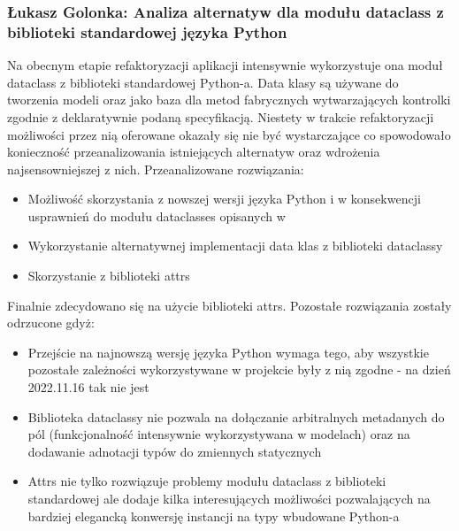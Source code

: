 \documentclass[12pt,a4paper,oneside]{article}
\theoremstyle{definition}
\numberwithin{equation}{section}
\begin{document}
\subsubsection{Łukasz Golonka: Analiza alternatyw dla modułu dataclass z biblioteki standardowej języka Python}
Na obecnym etapie refaktoryzacji aplikacji intensywnie wykorzystuje ona moduł dataclass z biblioteki standardowej Python-a.
Data klasy są używane do tworzenia modeli oraz jako baza dla metod fabrycznych wytwarzających kontrolki zgodnie z deklaratywnie podaną specyfikacją.
Niestety w trakcie refaktoryzacji możliwości przez nią oferowane okazały się nie być wystarczające co spowodowało konieczność przeanalizowania istniejących alternatyw oraz wdrożenia najsensowniejszej z nich.
Przeanalizowane rozwiązania:
\begin{itemize}
	\item Możliwość skorzystania z nowszej wersji języka Python i w konsekwencji usprawnień do modułu dataclasses opisanych w \cite{py310dcls}
	\item Wykorzystanie alternatywnej implementacji data klas z biblioteki dataclassy \cite{dataclassy}
	\item Skorzystanie z biblioteki attrs \cite{attrs}
\end{itemize}
Finalnie zdecydowano się na użycie biblioteki attrs. 
Pozostałe rozwiązania zostały odrzucone gdyż:
\begin{itemize}
	\item Przejście na najnowszą wersję języka Python wymaga tego, aby wszystkie pozostałe zależności wykorzystywane w projekcie były z nią zgodne - na dzień 2022.11.16 tak nie jest
	\item Biblioteka dataclassy nie pozwala na dołączanie arbitralnych metadanych do pól (funkcjonalność intensywnie wykorzystywana w modelach) oraz na dodawanie adnotacji typów do zmiennych statycznych
	\item Attrs nie tylko rozwiązuje problemy modułu dataclass z biblioteki standardowej ale dodaje kilka interesujących możliwości pozwalających na bardziej elegancką konwersję instancji na typy wbudowane Python-a
\end{itemize}
\end{document}
